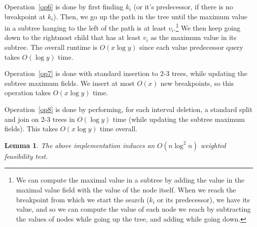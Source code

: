 \documentclass[11pt,a4paper]{article}
\newtheorem{lemma}{Lemma}
\theoremstyle{definition}
\theoremstyle{remark}
\begin{document}
 Operation~\ref{op6} is done by first finding $k_i$ (or it's predecessor, if there is no breakpoint at $k_i$). Then, we go up the path in the tree until the maximum value in a subtree hanging to the left of the path is at least $v_i$.\footnote{We can compute the maximal value in a subtree by adding the value in the maximal value field with the value of the node itself. When we reach the breakpoint from which we start the search ($k_i$ or its predecessor), we have its value, and so we can compute the value of each node we reach by subtracting the values of nodes while going up the tree, and adding while going down.} We then keep going down to the rightmost child that has at least $v_i$ as the maximum value in its subtree. The overall runtime is $O(x \log y)$ since each value predecessor query takes $O(\log y)$ time.

 Operation~\ref{op7} is done with  standard insertion to 2-3 trees, while updating the subtree maximum fields. We insert at most $O(x)$ new breakpoints, so this operation takes $O(x \log y)$ time.

 Operation~\ref{op8} is done by performing, for each interval deletion, a standard split and join on 2-3 trees in $O(\log y)$ time (while updating the subtree maximum fields).  This takes  $O(x \log y)$ time overall.


\begin{lemma} \label{nlog^2n running time for weighted f.t. lemma}
The above implementation induces an $O(n \log ^2 n)$ weighted feasibility test.
\end{lemma}
\end{document}
